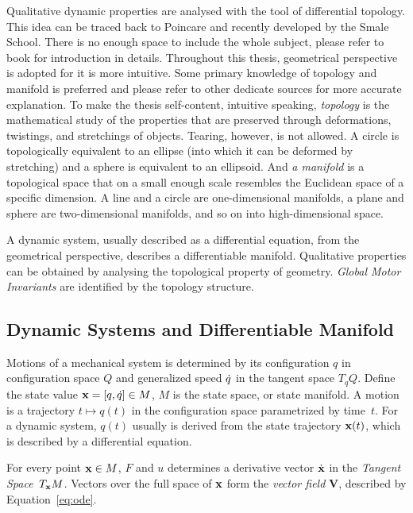 Qualitative dynamic properties are analysed with the tool of differential topology.
This idea can be traced back to Poincare\citep{Poincar'e1899,Poincar'e1885} and recently developed by the Smale School\citep{Smale1970}.
There is no enough space to include the whole subject, please refer to book \citep{abraham1978foundations}for introduction in details.
Throughout this thesis,  geometrical perspective is adopted for it is more intuitive.
Some primary knowledge of topology and manifold is preferred and please refer to other dedicate sources for more accurate explanation. To make the thesis self-content, intuitive speaking,   \emph{topology} is the mathematical study of the properties that are preserved through deformations, twistings, and stretchings of objects. Tearing, however, is not allowed. A circle is topologically equivalent to an ellipse (into which it can be deformed by stretching) and a sphere is equivalent to an ellipsoid. And \emph{a manifold} is a topological space that on a small enough scale resembles the Euclidean space of a specific dimension.  A line and a circle are one-dimensional manifolds, a plane and sphere  are two-dimensional manifolds, and so on into high-dimensional space.


A dynamic system, usually described as a differential equation, from the geometrical perspective, describes a differentiable manifold.
Qualitative properties can be obtained by analysing the topological  property of geometry.
\emph{Global Motor Invariants} are identified by the topology structure.





\subsection{Dynamic Systems and Differentiable Manifold}
Motions of a mechanical system is determined by its configuration  $q$ in configuration space $Q$ and generalized speed $\dot{q}$ in the tangent space $T_{q}Q$. 
Define the state value $\mathbf{x}=[q,\dot{q}] \in M$,  $M$ is the state space, or state manifold.
A motion is a trajectory $t \mapsto q(t)$ in the configuration space parametrized by time~$t$.
For a dynamic system, $q(t)$ usually is derived from the state trajectory $\mathbf{x}(t)$, which is described by a differential equation. 



For every point $\mathbf{x} \in M$, 
$F$ and $u$ determines a derivative vector $\dot{\mathbf{x}}$ in the \emph{Tangent Space}~$T_{\mathbf{x}}M$. 
Vectors over the full space of $\mathbf{x}$ form the \emph{vector field} $\mathbf{V}$, described by Equation~\ref{eq:ode}.


